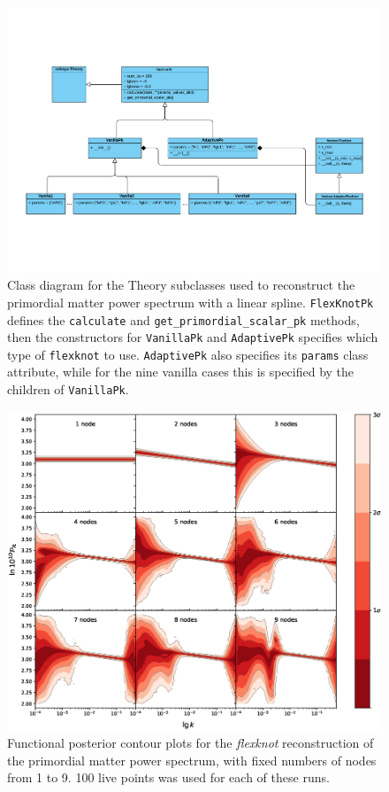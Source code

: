 \documentclass{article}
\begin{document}
\begin{figure}
  \centering
  \includegraphics[width=16cm]{Pk_linf.pdf}
  \caption{Class diagram for the Theory subclasses used to reconstruct the primordial matter power spectrum with a linear spline. \texttt{FlexKnotPk} defines the \texttt{calculate} and \texttt{get\_primordial\_scalar\_pk} methods, then the constructors for \texttt{VanillaPk} and \texttt{AdaptivePk} specifies which type of \texttt{flexknot} to use. \texttt{AdaptivePk} also specifies its \texttt{params} class attribute, while for the nine vanilla cases this is specified by the children of \texttt{VanillaPk}.}
  \label{fig:PkUMLDiagram}
\end{figure}

\newpage

\begin{figure}[H]
  \centering
  \includegraphics[width=16cm]{vanilla100.eps}
  \caption{Functional posterior contour plots for the \textit{flexknot} reconstruction of the primordial matter power spectrum, with fixed numbers of nodes from 1 to 9. 100 live points was used for each of these runs.}
  \label{fig:Pk_vanilla_100}
\end{figure}
\end{document}
